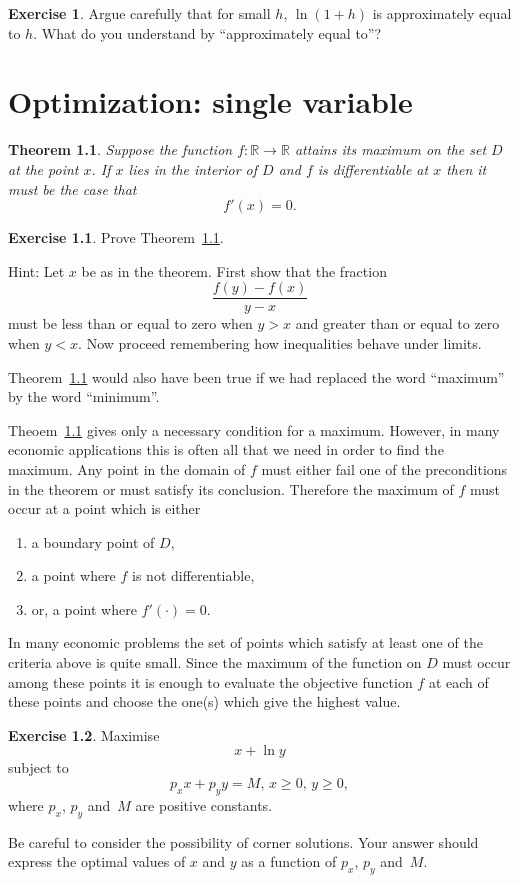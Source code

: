 \documentclass[11pt,reqno,openany]{amsbook}
\numberwithin{figure}{chapter}
\numberwithin{equation}{chapter}
\theoremstyle{plain}
\newtheorem{thm}{Theorem}[chapter]
\theoremstyle{definition}
\newtheorem{xca}{Exercise}[chapter]
\renewcommand{\Re}{\mathbb{R}}
\begin{document}
\begin{xca}
  Argue carefully that for small $h$, $\ln(1+h)$ is approximately
  equal to $h$. What do you understand by ``approximately equal to''?
\end{xca}

\chapter{Optimization: single variable}
\begin{thm}\label{thm:opt1:interior}
  Suppose the function $f\colon \Re \to \Re$ attains its
  maximum on the set $D$ at the point $x$. If $x$ lies in
  the interior of $D$ and $f$ is differentiable at $x$ then
  it must be the case that
  \[f'(x)=0.\]
\end{thm}
\begin{xca}
  Prove Theorem~\ref{thm:opt1:interior}. 

  Hint: Let $x$ be as in the theorem. First show that the
  fraction
  \[\frac{f(y)-f(x)}{y-x}\]
  must be less than or equal to zero when $y>x$ and greater
  than or equal to zero when $y<x$. Now proceed remembering
  how inequalities behave under limits.
\end{xca}

Theorem~\ref{thm:opt1:interior} would also have been true if
we had replaced the word ``maximum'' by the word
``minimum''.

Theoem~\ref{thm:opt1:interior} gives only a necessary
condition for a maximum. However, in many economic applications
this is often all that we need in order to find the maximum. Any point
in the domain of $f$ must either fail one of the
preconditions in the theorem or must satisfy its
conclusion. Therefore the maximum of $f$ must occur at a
point which is either
\begin{enumerate}
\item a boundary point of $D$,
\item a point where $f$ is not differentiable,
\item or, a point where $f'(\cdot)=0$.
\end{enumerate}
In many economic problems the set of points which satisfy at
least one of the criteria above is quite small. Since the maximum of the
function on $D$ must occur among these points it is enough
to evaluate the objective function $f$ at each of these
points and choose the one(s) which give the highest value.

\begin{xca}
Maximise
\[x + \ln y\]
subject to
\[p_x x + p_y y = M,\, x\ge 0,\,y\ge 0,\]
where $p_x$, $p_y$ and~$M$ are positive constants.

Be careful to consider the possibility of corner
solutions. Your answer should express the optimal values of
$x$ and $y$ as a function of $p_x$, $p_y$ and~$M$.
\end{xca}
\end{document}
